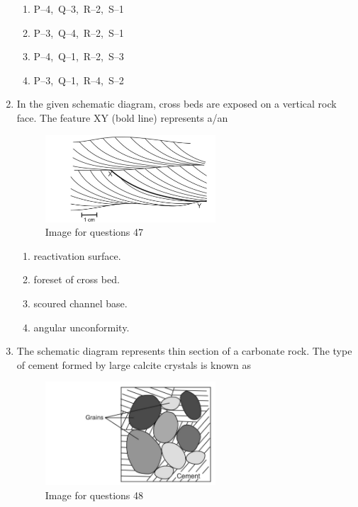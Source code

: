\documentclass[journal,12pt,onecolumn]{IEEEtran}
\theoremstyle{remark}
\begin{document}
\begin{enumerate}
\begin{enumerate}
\item P--4,\ Q--3,\ R--2,\ S--1
\item P--3,\ Q--4,\ R--2,\ S--1
\item P--4,\ Q--1,\ R--2,\ S--3
\item P--3,\ Q--1,\ R--4,\ S--2
\end{enumerate}
\vspace{0.5cm}

\item In the given schematic diagram, cross beds are exposed on a vertical rock face. The feature XY (bold line) represents a/an


\begin{figure}[H]
    \centering
    \includegraphics[width=0.6\textwidth]{figs/fig7.png}
    \caption{Image for questions 47}
    \label{fig:question47}
\end{figure}
\vspace{0.5cm}








\begin{enumerate}
\item reactivation surface.
\item foreset of cross bed.
\item scoured channel base.
\item angular unconformity.
\end{enumerate}
\vspace{0.5cm}

\item The schematic diagram represents thin section of a carbonate rock. The type of cement formed by large calcite crystals is known as

\begin{figure}[H]
    \centering
    \includegraphics[width=0.6\textwidth]{figs/fig8.png}
    \caption{Image for questions 48}
    \label{fig:question48}
\end{figure}
\vspace{0.5cm}







\end{enumerate}
\end{document}
